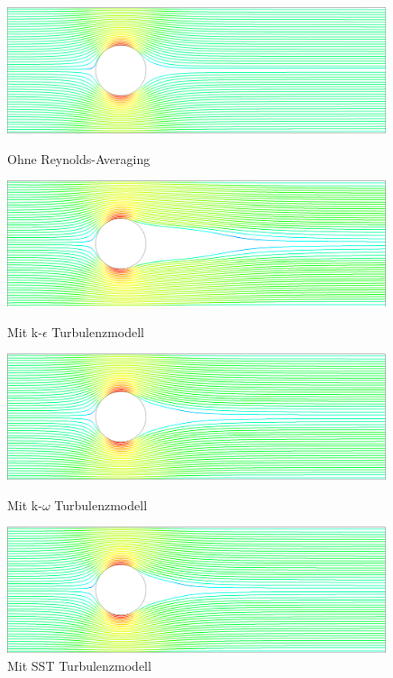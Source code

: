 \begin{figure}
  \centering
  \includegraphics[width=0.99\textwidth]{papers/reynolds/croppedimages/dns.png}
  \vspace*{-6pt}
  \caption{Ohne Reynolds-Averaging}
  \label{fig:ohne}
  \vspace*{6pt}
  \includegraphics[width=0.99\textwidth]{papers/reynolds/croppedimages/k-e.png}
  \vspace*{-6pt}
  \caption{Mit k-$\epsilon$ Turbulenzmodell}
  \label{fig:k-e}
  \vspace*{6pt}
  \includegraphics[width=0.99\textwidth]{papers/reynolds/croppedimages/k-w.png}
  \vspace*{-6pt}
  \caption{Mit k-$\omega$ Turbulenzmodell}
  \label{fig:k-w}
  \vspace*{6pt}
  \includegraphics[width=0.99\textwidth]{papers/reynolds/croppedimages/sst.png}
  \vspace*{-6pt}
  \caption{Mit SST Turbulenzmodell}
  \label{fig:SST}
\end{figure}

